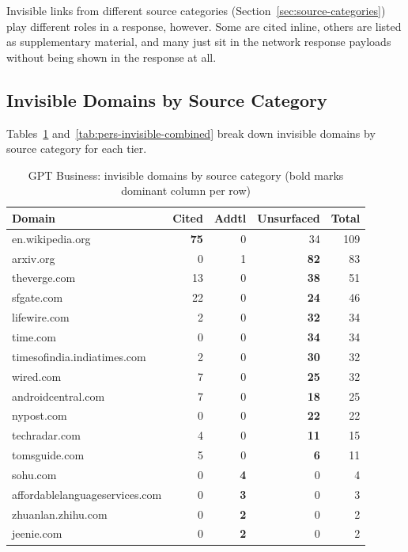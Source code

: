 Invisible links from different source categories (Section~\ref{sec:source-categories}) play different roles in a response, however.
Some are cited inline, others are listed as supplementary material,
and many just sit in the network response payloads without being 
shown in the response at all.


\subsection{Invisible Domains by Source Category}
\label{sec:invisible-citation-fate}
\label{sec:rejected}
\label{sec:cited-invisible-final}

Tables~\ref{tab:ent-invisible-combined} and~\ref{tab:pers-invisible-combined} break down invisible domains by source category for each tier.

\begin{table}[H]
\centering
\caption{GPT Business: invisible domains by source category
(bold marks dominant column per row)}
\label{tab:ent-invisible-combined}
\small
\begin{tabular}{lrrrr}
\toprule
Domain & Cited & Addtl & Unsurfaced & Total \\
\midrule
en.wikipedia.org & \textbf{75} & 0 & 34 & 109 \\
arxiv.org & 0 & 1 & \textbf{82} & 83 \\
theverge.com & 13 & 0 & \textbf{38} & 51 \\
sfgate.com & 22 & 0 & \textbf{24} & 46 \\
lifewire.com & 2 & 0 & \textbf{32} & 34 \\
time.com & 0 & 0 & \textbf{34} & 34 \\
timesofindia.indiatimes.com & 2 & 0 & \textbf{30} & 32 \\
wired.com & 7 & 0 & \textbf{25} & 32 \\
androidcentral.com & 7 & 0 & \textbf{18} & 25 \\
nypost.com & 0 & 0 & \textbf{22} & 22 \\
techradar.com & 4 & 0 & \textbf{11} & 15 \\
tomsguide.com & 5 & 0 & \textbf{6} & 11 \\
sohu.com & 0 & \textbf{4} & 0 & 4 \\
affordablelanguageservices.com & 0 & \textbf{3} & 0 & 3 \\
zhuanlan.zhihu.com & 0 & \textbf{2} & 0 & 2 \\
jeenie.com & 0 & \textbf{2} & 0 & 2 \\
\bottomrule
\end{tabular}
\end{table}

